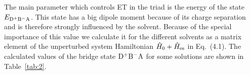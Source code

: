 \documentclass[12pt,twoside,a4paper]{report}
\begin{document}


The main parameter which controls ET in the triad is the
energy of the state $E_{\rm D^+B^-A}$. This state has a big dipole moment
because of its charge separation and is therefore strongly influenced by the solvent. 
Because of the special importance of this value we calculate it for
the different solvents as a matrix element of the unperturbed system
Hamiltonian $\hat H_0 + \hat H_{\rm es}$ in Eq.~(4.1).  The calculated values of the bridge state
${\rm D^+B^-A}$ for some solutions are shown in Table~\ref{tab:2}. 

\end{document}
